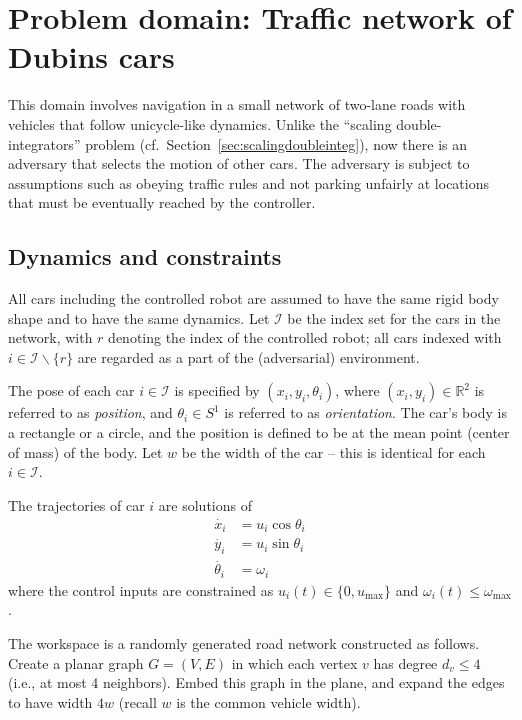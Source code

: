 \documentclass{amsart}
\theoremstyle{definition}
\begin{document}
\section{Problem domain: Traffic network of Dubins cars}\label{sec:trafficdubins}

This domain involves navigation in a small network of two-lane roads with
vehicles that follow unicycle-like dynamics. Unlike the ``scaling
double-integrators'' problem (cf.\ Section~\ref{sec:scalingdoubleinteg}), now
there is an adversary that selects the motion of other cars.  The adversary is
subject to assumptions such as obeying traffic rules and not parking unfairly at
locations that must be eventually reached by the controller.

\subsection{Dynamics and constraints}
All cars including the controlled robot are assumed to have the same rigid body
shape and to have the same dynamics. Let $\mathcal I$ be the index set for the
cars in the network, with $r$ denoting the index of the controlled robot; all
cars indexed with $i \in {\mathcal I}\backslash\{r\}$ are regarded as a part of
the (adversarial) environment.

The pose of each car $i \in {\mathcal I}$ is specified by $(x_i,y_i,\theta_i)$,
where $(x_i,y_i)\in \mathbb{R}^2$ is referred to as \textit{position}, and
$\theta_i \in S^1$ is referred to as \textit{orientation}.  The car's body is a
rectangle or a circle, and the position is defined to be at the mean point
(center of mass) of the body.  Let $w$ be the width of the car -- this is
identical for each $i \in {\mathcal I}$.

The trajectories of car $i$ are solutions of
\begin{align}
\dot{x_i} &= u_i \cos \theta_i \\
\dot{y_i} &= u_i \sin \theta_i \\
\dot{\theta_i} &= \omega_i
\end{align}
where the control inputs are constrained as $u_i(t)\in \{0,u_{\mathrm{max}}\}$ and
$\omega_i(t) \leq \omega_{\mathrm{max}}$.


The workspace is a randomly generated road network constructed as follows.
Create a planar graph $G = (V,E)$ in which each vertex $v$ has degree $d_v \le 4$
(i.e., at most 4 neighbors).  Embed this graph in the plane, and expand the
edges to have width $4w$ (recall $w$ is the common vehicle width).
\end{document}
